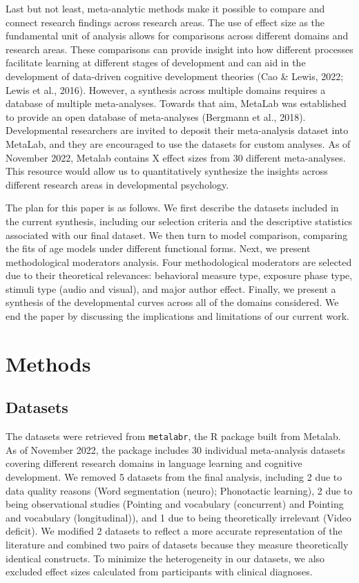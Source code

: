 \documentclass[10pt, letterpaper]{article}
\begin{document}
Last but not least, meta-analytic methods make it possible to compare
and connect research findings across research areas. The use of effect
size as the fundamental unit of analysis allows for comparisons across
different domains and research areas. These comparisons can provide
insight into how different processes facilitate learning at different
stages of development and can aid in the development of data-driven
cognitive development theories (Cao \& Lewis, 2022; Lewis et al., 2016).
However, a synthesis across multiple domains requires a database of
multiple meta-analyses. Towards that aim, MetaLab was established to
provide an open database of meta-analyses (Bergmann et al., 2018).
Developmental researchers are invited to deposit their meta-analysis
dataset into MetaLab, and they are encouraged to use the datasets for
custom analyses. As of November 2022, Metalab contains X effect sizes
from 30 different meta-analyses. This resource would allow us to
quantitatively synthesize the insights across different research areas
in developmental psychology.

The plan for this paper is as follows. We first describe the datasets
included in the current synthesis, including our selection criteria and
the descriptive statistics associated with our final dataset. We then
turn to model comparison, comparing the fits of age models under
different functional forms. Next, we present methodological moderators
analysis. Four methodological moderators are selected due to their
theoretical relevances: behavioral measure type, exposure phase type,
stimuli type (audio and visual), and major author effect. Finally, we
present a synthesis of the developmental curves across all of the
domains considered. We end the paper by discussing the implications and
limitations of our current work.

\hypertarget{methods}{%
\section{Methods}\label{methods}}

\hypertarget{datasets}{%
\subsection{Datasets}\label{datasets}}

The datasets were retrieved from \texttt{metalabr}, the R package built
from Metalab. As of November 2022, the package includes 30 individual
meta-analysis datasets covering different research domains in language
learning and cognitive development. We removed 5 datasets from the final
analysis, including 2 due to data quality reasons (Word segmentation
(neuro); Phonotactic learning), 2 due to being observational studies
(Pointing and vocabulary (concurrent) and Pointing and vocabulary
(longitudinal)), and 1 due to being theoretically irrelevant (Video
deficit). We modified 2 datasets to reflect a more accurate
representation of the literature and combined two pairs of datasets
because they measure theoretically identical constructs. To minimize the
heterogeneity in our datasets, we also excluded effect sizes calculated
from participants with clinical diagnoses.
\end{document}
